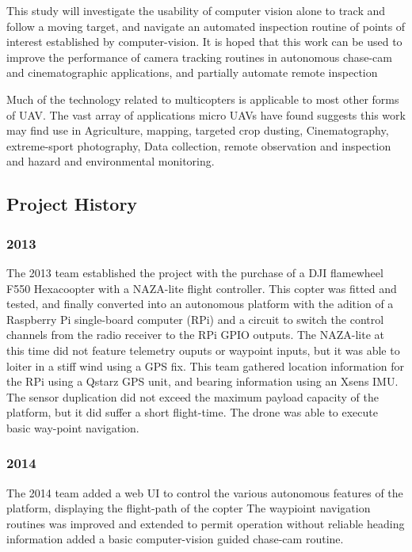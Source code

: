 \documentclass[a4paper, 11pt, titlepage]{article}
\begin{document}
    This study will investigate the usability of computer vision alone to track and follow a moving target, and navigate an automated inspection routine of points of interest established by computer-vision.  It is hoped that this work can be used to improve the performance of camera tracking routines in autonomous chase-cam and cinematographic applications, and partially automate remote inspection 

    Much of the technology related to multicopters is applicable to most other forms of UAV.  The vast array of applications micro UAVs have found suggests this work may find use in Agriculture, mapping, targeted crop dusting, Cinematography, extreme-sport photography, Data collection, remote observation and inspection and hazard and environmental monitoring.


  \subsection{Project History}
    \subsubsection{2013}
    The 2013 team established the project with the purchase of a DJI flamewheel F550 Hexacoopter with a NAZA-lite flight controller.  This copter was fitted and tested, and finally converted into an autonomous platform with the adition of a Raspberry Pi single-board computer (RPi) and a circuit to switch the control channels from the radio receiver to the RPi GPIO outputs.
    The NAZA-lite at this time did not feature telemetry ouputs or waypoint inputs, but it was able to loiter in a stiff wind using a GPS fix.
    This team gathered location information for the RPi using a Qstarz GPS unit, and bearing information using an Xsens IMU.  The sensor duplication did not exceed the maximum payload capacity of the platform, but it did suffer a short flight-time.
    The drone was able to execute basic way-point navigation.
    \subsubsection{2014}
    The 2014 team added a web UI to control the various autonomous features of the platform, displaying the flight-path of the copter
    The waypioint navigation routines was improved and extended to permit operation without reliable heading information
    added a basic computer-vision guided chase-cam routine.
\end{document}
